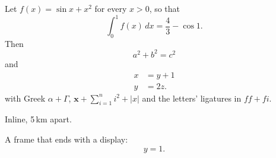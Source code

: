 \documentclass{beamer}
\begin{document}
\begin{frame}
Let $f(x) = \sin x + x^2$ for every $x > 0$, so that
\[ \int_0^1 f(x)\,dx = \frac{4}{3} - \cos 1. \]
Then
\begin{equation}
a^2 + b^2 = c^2
\end{equation}
and
\begin{align}
x &= y + 1 \\
y &= 2z.
\end{align}
with Greek $\alpha + \Gamma$, $\mathbf{x} + \sum_{i=1}^n i^2 + \lvert x \rvert$ and the letters' ligatures in $ff + fi$.
\end{frame}
\begin{frame}
Inline, 5\,km apart.

A frame that ends with a display:
\[ y = 1. \]
\end{frame}
\end{document}
